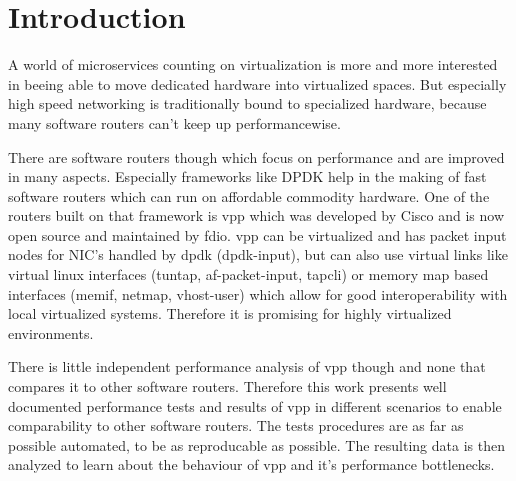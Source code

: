
\chapter{Introduction}


A world of microservices counting on virtualization is more and
more interested in beeing able to move dedicated hardware into
virtualized spaces. But especially high speed networking is
traditionally bound to specialized hardware, because many software
routers can't keep up performancewise.


There are software routers though which focus on performance and are
improved in many aspects. Especially frameworks like DPDK help in the
making of fast software routers which can run on affordable commodity
hardware. One of the routers built on that framework is \Ac{vpp} which
was developed by Cisco and is now open source and maintained by
\Ac{fdio}. \Ac{vpp} can be virtualized and has packet input nodes for
NIC's handled by \Ac{dpdk} (dpdk-input), but can also use virtual
links like virtual linux interfaces (tuntap, af-packet-input, tapcli)
or memory map based interfaces (memif, netmap, vhost-user) which allow
for good interoperability with local virtualized systems. Therefore it
is promising for highly virtualized environments.





There is little independent performance analysis of \Ac{vpp} though
and none that compares it to other software routers. Therefore this
work presents well documented performance tests and results of
\Ac{vpp} in different scenarios to enable comparability to other
software routers. The tests procedures are as far as possible
automated, to be as reproducable as possible. The resulting data is
then analyzed to learn about the behaviour of \Ac{vpp} and it's
performance bottlenecks.

